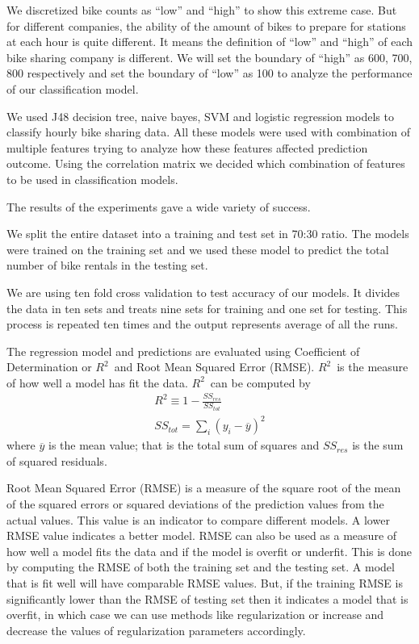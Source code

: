 \documentclass[12pt]{article}
\newcommand{\rtt}{${\mathit R}^2$}
\begin{document}
We discretized bike counts as ``low'' and ``high'' to show this extreme
case. But for different companies, the ability of the amount of bikes to
prepare for stations at each hour is quite different. It means the definition
of ``low'' and ``high'' of each bike sharing company is different. We will set
the boundary of ``high'' as 600, 700, 800 respectively and set the boundary of
``low'' as 100 to analyze the performance of our classification model.

We used J48 decision tree, naive bayes, SVM and logistic regression models to
classify hourly bike sharing data. All these models were used with combination
of multiple features trying to analyze how these features affected prediction
outcome. Using the correlation matrix we decided which combination of features
to be used in classification models.



The results of the experiments gave a wide variety of success.


We split the entire dataset into a training and test set in 70:30 ratio. The
models were trained on the training set and we used these model to predict the
total number of bike rentals in the testing set.


We are using ten fold cross validation to test accuracy of our models. It
divides the data in ten sets and treats nine sets for training and one set for
testing. This process is repeated ten times and the output represents average
of all the runs.


The regression model and predictions are evaluated using Coefficient of
Determination or \rtt\ and Root Mean Squared Error (RMSE).  \rtt\ is the
measure of how well a model has fit the data. \rtt\ can be computed by
\begin{equation}
\begin{gathered}
R^2 \equiv 1 - \frac{SS_{res}}{SS_{tot}}\\
SS_{tot} = \sum_i(y_i - \overline{y})^2
\end{gathered}
\end{equation}
where $\overline{y}$ is the mean value; that is the total sum of squares and
$SS_{res}$ is the sum of squared residuals.

Root Mean Squared Error (RMSE) is a measure of the square root of the mean of
the squared errors or squared deviations of the prediction values from the
actual values. This value is an indicator to compare different models. A lower
RMSE value indicates a better model.  RMSE can also be used as a measure of how
well a model fits the data and if the model is overfit or underfit. This is
done by computing the RMSE of both the training set and the testing set. A
model that is fit well will have comparable RMSE values. But, if the training
RMSE is significantly lower than the RMSE of testing set then it indicates a
model that is overfit, in which case we can use methods like regularization or
increase and decrease the values of regularization parameters accordingly.
\end{document}
